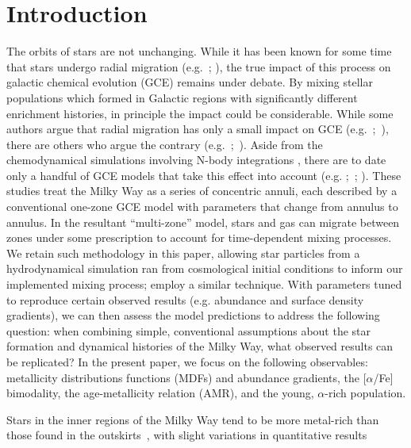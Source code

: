 \documentclass[fleqn, usenatbib]{mnras}
\begin{document}
\section{Introduction} 
\label{sec:intro} 
The orbits of stars are not unchanging. While it has been known for some time 
that stars undergo radial migration (e.g.~\citealp*{Wielen1996}; 
\citealp{Roskar2008a,Loebman2011,Minchev2012}), the true impact of this process 
on galactic chemical evolution (GCE) remains under debate. By mixing stellar 
populations which formed in Galactic regions with significantly different 
enrichment histories, in principle the impact could be considerable. While some 
authors argue that radial migration has only a small impact on GCE 
(e.g.~\citealp*{Kubryk2013};~\citealp{Khoperskov2021}), there are others who 
argue the contrary (e.g.~\citealp{Schoenrich2009};~\citealp*{Sharma2020}). 
Aside from the chemodynamical simulations involving N-body integrations 
\citep[e.g.][]{Kubryk2013, Vincenzo2020, Khoperskov2021}, there are to date 
only a handful of GCE models that take this effect into account (e.g. 
\citealp{Matteucci1989, Schoenrich2009};~\citealp*{Minchev2013}; 
\citealp{Sharma2020}). These studies treat the Milky Way as a series of 
concentric annuli, each described by a conventional one-zone GCE model with 
parameters that change from annulus to annulus. In the resultant ``multi-zone'' 
model, stars and gas can migrate between zones under some prescription to 
account for time-dependent mixing processes. We retain such methodology in this 
paper, allowing star particles from a hydrodynamical simulation ran from 
cosmological initial conditions to inform our implemented mixing process; 
\citet{Minchev2013} employ a similar technique. With parameters tuned to 
reproduce certain observed results (e.g. abundance and surface density 
gradients), we can then assess the model predictions to address the following 
question: when combining simple, conventional assumptions about the star 
formation and dynamical histories of the Milky Way, what observed results can 
be replicated? In the present paper, we focus on the following observables: 
metallicity distributions functions (MDFs) and abundance gradients, the 
[$\alpha$/Fe] bimodality, the age-metallicity relation (AMR), and the young, 
$\alpha$-rich population. 
\par 
Stars in the inner regions of the Milky Way tend to be more metal-rich than 
those found in the outskirts~\citep{Nordstroem2004b, Daflon2009, 
Frinchaboy2013, Hayden2014}, with slight variations in quantitative results 
\end{document}
